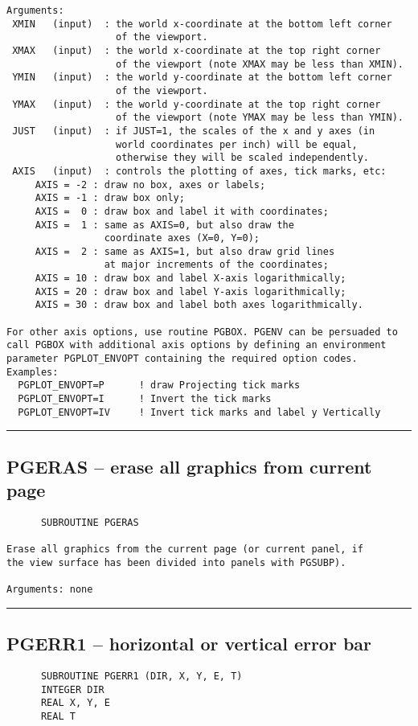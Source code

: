{\begin{verbatim}
Arguments:
 XMIN   (input)  : the world x-coordinate at the bottom left corner
                   of the viewport.
 XMAX   (input)  : the world x-coordinate at the top right corner
                   of the viewport (note XMAX may be less than XMIN).
 YMIN   (input)  : the world y-coordinate at the bottom left corner
                   of the viewport.
 YMAX   (input)  : the world y-coordinate at the top right corner
                   of the viewport (note YMAX may be less than YMIN).
 JUST   (input)  : if JUST=1, the scales of the x and y axes (in
                   world coordinates per inch) will be equal,
                   otherwise they will be scaled independently.
 AXIS   (input)  : controls the plotting of axes, tick marks, etc:
     AXIS = -2 : draw no box, axes or labels;
     AXIS = -1 : draw box only;
     AXIS =  0 : draw box and label it with coordinates;
     AXIS =  1 : same as AXIS=0, but also draw the
                 coordinate axes (X=0, Y=0);
     AXIS =  2 : same as AXIS=1, but also draw grid lines
                 at major increments of the coordinates;
     AXIS = 10 : draw box and label X-axis logarithmically;
     AXIS = 20 : draw box and label Y-axis logarithmically;
     AXIS = 30 : draw box and label both axes logarithmically.

For other axis options, use routine PGBOX. PGENV can be persuaded to
call PGBOX with additional axis options by defining an environment
parameter PGPLOT_ENVOPT containing the required option codes. 
Examples:
  PGPLOT_ENVOPT=P      ! draw Projecting tick marks
  PGPLOT_ENVOPT=I      ! Invert the tick marks
  PGPLOT_ENVOPT=IV     ! Invert tick marks and label y Vertically
\end{verbatim}
\hrule


\subsection*{PGERAS -- erase all graphics from current page }
\begin{verbatim}
      SUBROUTINE PGERAS

Erase all graphics from the current page (or current panel, if
the view surface has been divided into panels with PGSUBP).

Arguments: none
\end{verbatim}
\hrule


\subsection*{PGERR1 -- horizontal or vertical error bar }
\begin{verbatim}
      SUBROUTINE PGERR1 (DIR, X, Y, E, T)
      INTEGER DIR
      REAL X, Y, E
      REAL T


\end{verbatim}}
